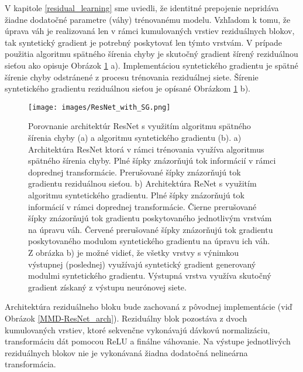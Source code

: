
V kapitole \ref{residual_learning} sme uviedli, že identitné prepojenie nepridáva žiadne dodatočné parametre (váhy) trénovanému modelu. Vzhľadom k tomu, že úprava váh je realizovaná len v rámci kumulovaných vrstiev reziduálnych blokov, tak syntetický gradient je potrebný poskytovať len týmto vrstvám. V prípade použitia algoritmu spätného šírenia chyby je skutočný gradient šírený reziduálnou sieťou ako opisuje Obrázok \ref{fig:ResNetWithSG} a). Implementáciou syntetického gradientu je spätné šírenie chyby odstránené z procesu trénovania reziduálnej siete. Šírenie syntetického gradientu reziduálnou sieťou je opísané Obrázkom \ref{fig:ResNetWithSG} b).

\begin{figure}

\centerline{\texttt{[image: images/ResNet\_with\_SG.png]}}
\caption[Reziduálna sieť s implementovaným algoritmom syntetického gradientu]{Porovnanie architektúr ResNet s využitím algoritmu spätného šírenia chyby (a) a algoritmu syntetického gradientu (b). a) Architektúra ResNet ktorá v rámci trénovania využíva algoritmus spätného šírenia chyby. Plné šípky znázorňujú tok informácií v rámci doprednej transformácie. Prerušované šípky znázorňujú tok gradientu reziduálnou sieťou. b) Architektúra ReNet s využitím algoritmu syntetického gradientu. Plné šípky znázorňujú tok informácií v rámci doprednej transformácie. Čierne prerušované šípky znázorňujú tok gradientu poskytovaného jednotlivým vrstvám na úpravu váh. Červené prerušované šípky znázorňujú tok gradientu poskytovaného modulom syntetického gradientu na úpravu ich váh. Z obrázka b) je možné vidieť, že všetky vrstvy s výnimkou výstupnej (poslednej) využívajú syntetický gradient generovaný modulmi syntetického gradientu. Výstupná vrstva využíva skutočný gradient získaný z výstupu neurónovej siete.}
\label{fig:ResNetWithSG}
\end{figure}


Architektúra reziduálneho bloku bude zachovaná z pôvodnej implementácie (viď Obrázok \ref{MMD-ResNet_arch}). Reziduálny blok pozostáva z dvoch kumulovaných vrstiev, ktoré sekvenčne vykonávajú dávkovú normalizáciu, transformáciu dát pomocou ReLU a finálne váhovanie. Na výstupe jednotlivých reziduálnych blokov nie je vykonávaná žiadna dodatočná nelineárna transformácia.

